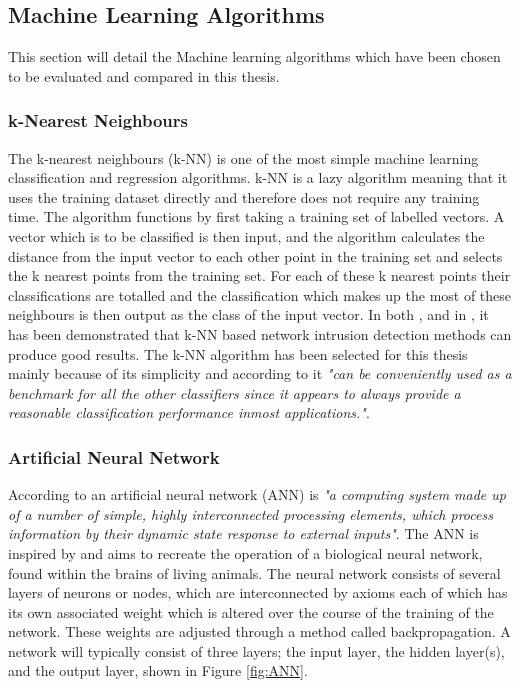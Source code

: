 	\subsection{Machine Learning Algorithms}
	This section will detail the Machine learning algorithms which have been chosen to be evaluated and compared in this thesis.
	\subsubsection{k-Nearest Neighbours}
	The k-nearest neighbours (k-NN) is one of the most simple machine learning classification and regression algorithms. k-NN is a lazy algorithm meaning that it uses the training dataset directly and therefore does not require any training time. The algorithm functions by first taking a training set of labelled vectors. A vector which is to be classified is then input, and the algorithm calculates the distance from the input vector to each other point in the training set and selects the k nearest points from the training set. For each of these k nearest points their classifications are totalled and the classification which makes up the most of these neighbours is then output as the class of the input vector.
	In both \cite{liao2002use}, and in \cite{hautamaki2004outlier}, it has been demonstrated that k-NN based network intrusion detection methods can produce good results. The k-NN algorithm has been selected for this thesis mainly because of its simplicity and according to \cite{jain2000statistical} it \textit{"can  be  conveniently  used  as  a benchmark  for  all  the  other  classifiers  since  it  appears  to always  provide  a  reasonable  classification  performance  inmost applications."}.
	
	\subsubsection{Artificial Neural Network}
	According to \cite{caudill1987neural} an artificial neural network (ANN) is \textit{"a computing system made up of a number of simple, highly interconnected processing elements, which process information by their dynamic state response to external inputs"}. The ANN is inspired by and aims to recreate the operation of a biological neural network, found within the brains of living animals. The neural network consists of several layers of neurons or nodes, which are interconnected by axioms each of which has its own associated weight which is altered over the course of the training of the network. These weights are adjusted through a method called backpropagation. A network will typically consist of three layers; the input layer, the hidden layer(s), and the output layer, shown in Figure \ref{fig:ANN}.
	

